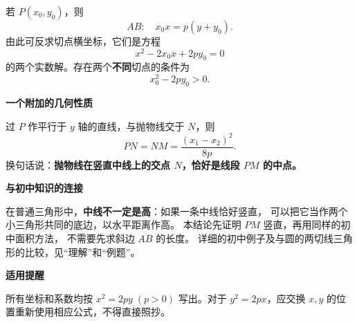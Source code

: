 \begin{statementbox}
\begin{description}[style=nextline, leftmargin=2.8em, labelsep=0.5em, itemsep=0.55em]
        \item[\textbf{\textcolor{CStatement}{结论四（切点弦）：}}]
        若 $P(x_0,y_0)$，则
        \[
            \boxed{AB:\quad x_0x=p(y+y_0).}
        \]
        由此可反求切点横坐标，它们是方程
        \[
            x^2-2x_0x+2py_0=0
        \]
        的两个实数解。存在两个\textbf{不同}切点的条件为
        \[
            \boxed{x_0^2-2py_0>0.}
        \]
    \end{description}

    \textbf{\textcolor{CStatement}{一个附加的几何性质}}

    过 $P$ 作平行于 $y$ 轴的直线，与抛物线交于 $N$，则
    \[
        \boxed{PN=NM=\frac{(x_1-x_2)^2}{8p}.}
    \]
    换句话说：\textbf{抛物线在竖直中线上的交点 $N$，恰好是线段 $PM$ 的中点。}


    \textbf{\textcolor{CStatement}{与初中知识的连接}}

    在普通三角形中，\textbf{中线不一定是高}：如果一条中线恰好竖直，
    可以把它当作两个小三角形共同的底边，以水平距离作高。
    本结论先证明 $PM$ 竖直，再用同样的初中面积方法，
    不需要先求斜边 $AB$ 的长度。
    详细的初中例子及与圆的两切线三角形的比较，见“理解”和“例题”。

    \medskip

    \textbf{\textcolor{CStatement}{适用提醒}}

    所有坐标和系数均按 $x^2=2py\;(p>0)$ 写出。对于 $y^2=2px$，应交换
    $x,y$ 的位置重新使用相应公式，不得直接照抄。
\end{statementbox}

